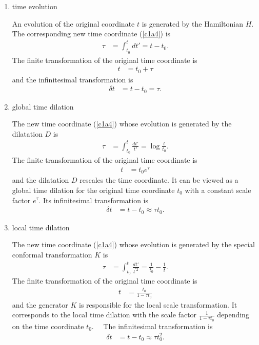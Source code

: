 \documentclass[12pt]{article}
\numberwithin{equation}{section}
\begin{document}
\begin{enumerate}

%
\item time evolution

An evolution of the original coordinate $t$ 
is generated by the Hamiltonian $H$.  
The corresponding new time coordinate (\ref{c1a4}) is
\begin{align}
\label{c1b1a}
\tau&=\int^{t}_{t_{0}}
dt'=t-t_{0}.
\end{align}
The finite transformation of the original time coordinate is 
\begin{align}
\label{c1b1b}
t&=t_{0}+\tau
\end{align}
and the infinitesimal transformation is 
\begin{align}
\label{c1b1c}
\delta t&=t-t_{0}=\tau. 
\end{align}

%
\item global time dilation

The new time coordinate (\ref{c1a4}) 
whose evolution is generated by the dilatation $D$ is 
\begin{align}
\label{c1b2a}
\tau&=\int_{t_{0}}^{t}\frac{dt'}{t'}
=\log \frac{t}{t_{0}}. 
\end{align}
The finite transformation of the original time coordinate is 
\begin{align}
\label{c1b2b}
t&=t_{0}e^{\tau}
\end{align}
and the dilatation $D$ rescales the time coordinate. 
It can be viewed as a global time dilation 
for the original time coordinate $t_{0}$ with a constant scale factor $e^{\tau}$. 
Its infinitesimal transformation is 
\begin{align}
\label{c1b2c}
\delta t&=t-t_{0}\approx \tau t_{0}.
\end{align}



\item local time dilation

The new time coordinate (\ref{c1a4}) 
whose evolution is generated by the special conformal transformation $K$ is 
\begin{align}
\label{c1b3a}
\tau&=\int_{t_{0}}^{t}\frac{dt'}{t^{'2}}
=\frac{1}{t_{0}}-\frac{1}{t}. 
\end{align}
The finite transformation of the original time coordinate is 
\begin{align}
\label{c1b3b}
t&=\frac{t_{0}}{1-\tau t_{0}}
\end{align}
and the generator $K$ 
is responsible for the local scale transformation. 
It corresponds to the local time dilation with the scale factor $\frac{1}{1-\tau t_{0}}$ depending 
on the time coordinate $t_{0}$.　
The infinitesimal transformation is
\begin{align}
\label{c1b3c}
\delta t&=t-t_{0}\approx \tau t_{0}^{2}. 
\end{align}
\end{enumerate}
\end{document}
